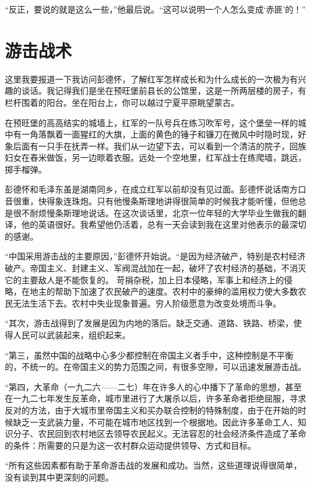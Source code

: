 \documentclass[10pt]{book}
\begin{document}
“反正，要说的就是这么一些，”他最后说。“这可以说明一个人怎么变成‘赤匪’的！”



\section{游击战术}

这里我要报道一下我访问彭德怀，了解红军怎样成长和为什么成长的一次极为有兴趣的谈话。我记得我们是坐在预旺堡前县长的公馆里，这是一所两层楼的房子，有栏杆围着的阳台。坐在阳台上，你可以越过宁夏平原眺望蒙古。

在预旺堡的高高结实的城墙上，红军的一队号兵在练习吹军号，这个堡垒一样的城中有一角落飘着一面猩红的大旗，上面的黄色的锤子和镰刀在微风中时隐时现，好象后面有一只手在抚弄一样。我们从一边望下去，可以看到一个清洁的院子，回族妇女在舂米做饭，另一边晾着衣服。远处一个空地里，红军战士在练爬墙，跳远，掷手榴弹。

彭德怀和毛泽东虽是湖南同乡，在成立红军以前却没有见过面。彭德怀说话南方口音很重，快得象连珠炮。只有他慢条斯理地讲得很简单的时候我才能听懂，但他总是很不耐烦慢条斯理地说话。在这次谈话里，北京一位年轻的大学毕业生做我的翻译，他的英语很好。我希望他仍活着，总有一天会读到我在这里对他表示的最深切的感谢。

“中国采用游击战的主要原因，”彭德怀开始说。“是因为经济破产，特别是农村经济破产。帝国主义、封建主义、军阀混战加在一起，破坏了农村经济的基础，不消灭它的主要敌人是不能恢复的。 苛捐杂税，加上日本侵略，军事上和经济上的侵略，在地主的帮助下加速了农民破产的速度。农村中的豪绅的滥用权力使大多数农民无法生活下去。农村中失业现象普遍。穷人阶级愿意为改变处境而斗争。

“其次，游击战得到了发展是因为内地的落后。缺乏交通、道路、铁路、桥梁，使得人民可以武装起来，组织起来。

“第三，虽然中国的战略中心多少都控制在帝国主义者手中，这种控制是不平衡的，不统一的。在帝国主义的势力范围之间，有很多空隙，可以迅速发展游击战。

“第四，大革命（一九二六——二七）年在许多人的心中播下了革命的思想，甚至在一九二七年发生反革命，城市里进行了大屠杀以后，许多革命者拒绝屈服，寻求反对的方法，由于大城市里帝国主义和买办联合控制的特殊制度，由于在开始的时候缺乏一支武装力量，不可能在城市地区找到一个根据地。因此许多革命工人、知识分子、农民回到农村地区去领导农民起义。无法容忍的社会经济条件造成了革命的条件：所需要的只是为这一农村群众运动提供领导、方式和目标。

“所有这些因素都有助于革命游击战的发展和成功。当然，这些道理说得很简单，没有谈到其中更深刻的问题。
\end{document}
